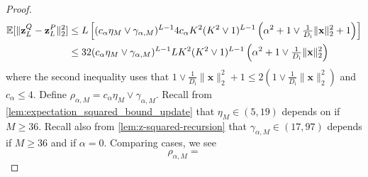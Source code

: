 \documentclass[twoside]{article}
\renewcommand{\ss}[1]{_{\text{#1}}}
\newcommand{\vx}{\mathbf{x}}
\newcommand{\vz}{\mathbf{z}}
\newcommand{\E}{\mathbb{E}}
\renewcommand{\ss}[1]{_{\text{#1}}}        %
\DeclarePairedDelimiter\norm{\|}{\|}             %
\theoremstyle{theoremstyle}
\begin{document}
\begin{proof}
\begin{align}
    \E[\norm{\vz^Q_{L} - \vz^P_{L}}_2^2] 
    &\le L \left[ (c_\alpha \eta_M \lor \gamma_{\alpha,M})^{L - 1} 4 c_\alpha K^2 (K^2 \lor 1)^{L - 1} \left(\alpha^2 + 1\lor \tfrac1{D\ss{i}}\|\vx\|^2_2+1\right) \right] \\
    &\le 32 (c_\alpha \eta_M \lor \gamma_{\alpha,M})^{L - 1} L K^2 (K^2 \lor 1)^{L - 1} \left(\alpha^2 + 1\lor \tfrac1{D\ss{i}}\|\vx\|^2_2\right)
\end{align}
where the second inequality uses that $1\lor \tfrac1{D\ss{i}}\|\vx\|^2_2 + 1 \le 2 (1\lor \tfrac1{D\ss{i}}\|\vx\|^2_2)$ and $c_\alpha \le 4$. 
Define $\rho_{\alpha,M} = c_\alpha \eta_M \lor \gamma_{\alpha, M}$. Recall from \cref{lem:expectation_squared_bound_update} that $\eta_{M} \in (5, 19)$ depends on if $M \ge 36$. Recall also from \cref{lem:z-squared-recursion} that $\gamma_{\alpha, M} \in (17, 97)$ depends if $M \ge 36$ and if $\alpha=0$. Comparing cases, we see
\begin{equation}
    \rho_{\alpha, M} =

\end{equation}
\end{proof}
\end{document}
